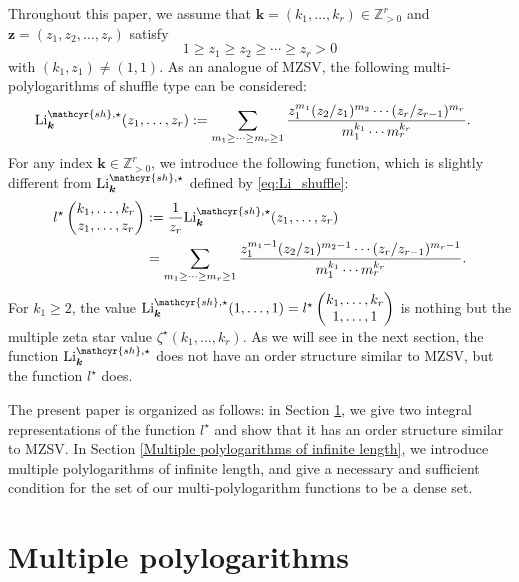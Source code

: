 \documentclass[12pt,a4paper]{article}
\theoremstyle{remark}
\begin{document}
Throughout this paper, 
we assume that 
$\boldsymbol{k}=(k_1,\ldots, k_r)\in
\mathbb{Z}_{>0}^r$ and $\boldsymbol{z}=(z_1,z_2,\ldots ,z_r)$
satisfy
\[ 1\ge z_1\ge z_2 \ge \cdots \ge z_r > 0\]
with $(k_1,z_1)\neq (1,1)$.
As an analogue of MZSV,
the following
multi-polylogarithms of shuffle type can be considered:
\begin{align}\label{eq:Li_shuffle}
\textrm{Li}_{\boldsymbol{k}}^{\mathcyr{sh},\star} (z_1, 
\ldots, z_r)
&:=
\sum_{m_1 \ge \cdots \ge m_r\ge 1}
 \dfrac{z_1^{m_1} (z_2/z_1)^{m_2}\cdots
(z_{r}/z_{r-1})^{m_r}}
{m_1^{k_1}\cdots m_r^{k_r}}.
\end{align} 
For any index $\boldsymbol{k}
\in \mathbb{Z}_{>0}^r$, 
we introduce the following function,
which is slightly different from 
$\textrm{Li}_{\boldsymbol{k}}^{\mathcyr{sh},\star}$
defined by \eqref{eq:Li_shuffle}:
\begin{align*}
l^{\star}
\begin{pmatrix}
k_1, \ldots , k_r \\
z_1, \ldots , z_r
\end{pmatrix}
&:=
\dfrac{1}{z_r}
\textrm{Li}_{\boldsymbol{k}}^{\mathcyr{sh},\star} (z_1, 
\ldots, z_r)\\
&=\sum_{m_1\ge \cdots \ge m_r \ge 1} 
\dfrac{z_1^{m_1-1} (z_2/z_1)^{m_2-1}\cdots
(z_{r}/z_{r-1})^{m_r-1}}
{m_1^{k_1}\cdots m_r^{k_r}}.
\end{align*}
For $k_1\ge 2$, the value
$\textrm{Li}_{\boldsymbol{k}}^{\mathcyr{sh},\star}
(1, \ldots, 1)=l^{\star}
\begin{pmatrix}
k_1, \ldots , k_r \\
1, \ldots , 1
\end{pmatrix}
$ is nothing but the 
multiple zeta star value
$\zeta^{\star}(k_1,\ldots, k_r)$.
As we will see in the next section,
the function $\textrm{Li}_{\boldsymbol{k}}^{\mathcyr{sh},\star}$ does not have an order structure similar to MZSV, but the function $l^{\star}$ does.

The present paper is organized as follows:
in Section \ref{Multiple polylogarithms}, 
we give two integral representations of 
the function $l^{\star}$
and show that it has an order structure 
similar to MZSV.
In Section \ref{Multiple polylogarithms of infinite length}, 
we introduce multiple polylogarithms of infinite length,
and give a necessary and
sufficient condition for the set of our multi-polylogarithm functions to be a dense set.


\section{Multiple polylogarithms}\label{Multiple polylogarithms}
\end{document}
